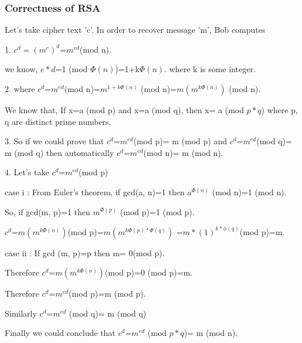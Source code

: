 \documentclass{article}
\begin{document}
\subsubsection{Correctness of RSA}
Let's take cipher text 'c'. In order to recover message 'm', Bob computes
\begin{description}
	


       \item 1.  $c^{d}=(m^{e})^{d}$=$m^{ed}$(mod n).
        
         we know, $e*d$=1 (mod $\Phi(n)$)=1+k$\Phi(n)$.  where k is some integer.
        
        \item 2. where $c^{d}$=$m^{ed}$(mod n)=$m^{1+k\Phi(n)}$ (mod n)=$m(m^{k \Phi(n)})$ (mod n).
        
        We know that, If x=a (mod p)   and x=a (mod q), then x= a (mod $p*q$) where p, q are distinct prime numbers.
        
        \item 3. So if we could prove that $c^{d}$=$m^{ed}$(mod p)= m (mod p) and $c^{d}$=$m^{ed}$(mod q)= m (mod q) then automatically $c^{d}$=$m^{ed}$(mod n)= m (mod n).
        
        \item4. Let's take $c^{d}$=$m^{ed}$(mod p)
        
        \item case i : From Euler's theorem, if gcd(a, n)=1 then $a^{\Phi(n)}$ (mod n)=1 (mod n).
        
        \item So, if gcd(m, p)=1 then   $m^{\Phi(p)}$ (mod p)=1 (mod p).
        
        $c^{d}$=$m(m^{k \Phi(n)})$(mod p)=$m(m^{k \Phi(p)*\Phi(q)})$ =$m*(1)^{k*\phi(q)}$(mod p)=m.
        
        
        \item case ii : If gcd (m, p)=p then m= 0(mod p).
        
        Therefore $c^{d}$=$m(m^{k \Phi(n)})$(mod p)=0 (mod p)=m.
        
        Therefore $c^{d}$=$m^{ed}$(mod p)=m (mod p).
        
        Similarly $c^{d}$=$m^{ed}$ (mod q)= m (mod q)
        
        Finally we could conclude that $c^{d}$=$m^{ed}$ (mod $p*q$)= m (mod n).
        
       
    \end{description}
        
\end{document}

